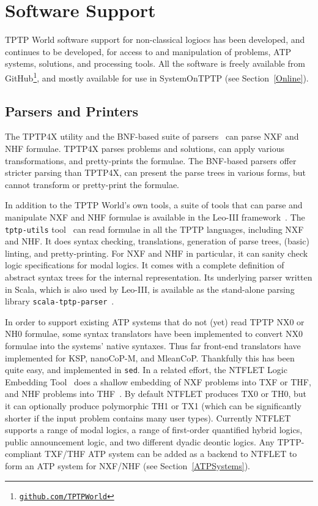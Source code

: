 \documentclass{ceurart}
\begin{document}
\section{Software Support}
\label{SystemsTools}

TPTP World software support for non-classical logiocs has been developed, and continues to be 
developed, for access to and manipulation of problems, ATP systems, solutions, and processing 
tools.
All the software is freely available from GitHub\footnote{%
\href{https://github.com/TPTPWorld}{\tt github.com/TPTPWorld}}, and mostly available for use in 
SystemOnTPTP (see Section~\ref{Online}).

\subsection{Parsers and Printers}
\label{Parsers}

The TPTP4X utility and the BNF-based suite of parsers~\cite{VS06} can parse NXF and NHF formulae.
TPTP4X parses problems and solutions, can apply various transformations, and pretty-prints the 
formulae.
The BNF-based parsers offer stricter parsing than TPTP4X, can present the parse trees in
various forms, but cannot transform or pretty-print the formulae.

In addition to the TPTP World's own tools, a suite of tools that can parse and manipulate 
NXF and NHF formulae is available in the Leo-III framework~\cite{SB21}.
The {\tt tptp-utils} tool~\cite{Ste22-TU} can read formulae in all the TPTP languages, including 
NXF and NHF.
It does syntax checking, translations, generation of parse trees, (basic) linting, and
pretty-printing.
For NXF and NHF in particular, it can sanity check logic specifications for modal logics.
It comes with a complete definition of abstract syntax trees for the internal representation.
Its underlying parser written in Scala, which is also used by Leo-III, is available as the 
stand-alone parsing library {\tt scala-tptp-parser}~\cite{Ste21}.

In order to support existing ATP systems that do not (yet) read TPTP NX0 or NH0 formulae,
some syntax translators have been implemented to convert NX0 formulae into the systems'
native syntaxes.
Thus far front-end translators have implemented for KSP, nanoCoP-M, and MleanCoP.
Thankfully this has been quite easy, and implemented in {\tt sed}.
In a related effort, the NTFLET Logic Embedding Tool~\cite{Ste22} does a shallow embedding of 
NXF problems into TXF or THF, and NHF problems into THF~\cite{BP13,BR13,GSB17,GS18}.
By default NTFLET produces TX0 or TH0, but it can optionally produce polymorphic TH1 or TX1
(which can be significantly shorter if the input problem contains many user types).
Currently NTFLET supports a range of modal logics, a range of first-order quantified hybrid 
logics, public announcement logic, and two different dyadic deontic logics.
Any TPTP-compliant TXF/THF ATP system can be added as a backend to NTFLET to form an 
ATP system for NXF/NHF (see Section~\ref{ATPSystems}).
\end{document}
